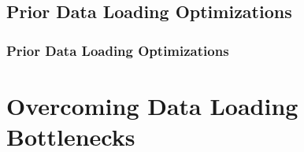 
\subsection{Prior Data Loading Optimizations} \label{Background: Data loading prior work}

\subsubsection{Prior Data Loading Optimizations}





\section{Overcoming Data Loading Bottlenecks}



